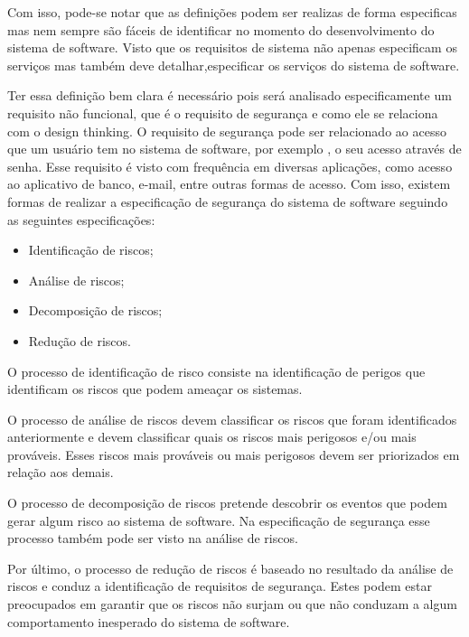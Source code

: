 \documentclass[a4paper,twoside]{article}
\begin{document}
Com isso, pode-se notar que as definições podem ser realizas de forma especificas mas nem sempre são fáceis de identificar no momento do desenvolvimento do sistema de software. Visto que os requisitos de sistema não apenas especificam os serviços mas também deve detalhar,especificar os serviços do sistema de software\cite{Sommerville_2011_texbook}.

Ter essa definição bem clara é necessário pois será analisado especificamente um requisito não funcional, que é o requisito de segurança e como ele se relaciona com o design thinking.
O requisito de segurança pode ser relacionado ao acesso que um usuário tem no sistema de software, por exemplo , o seu acesso através de senha. Esse requisito é visto com frequência em diversas aplicações, como acesso ao aplicativo de banco, e-mail, entre outras formas de acesso. Com isso, existem formas de realizar a especificação de segurança do sistema de software seguindo as seguintes especificações\cite{Sommerville_2011_texbook}:

\begin{itemize}
    \item Identificação de riscos;
    \item Análise de riscos;
    \item Decomposição de riscos;
    \item Redução de riscos.
\end{itemize}

O processo de  identificação de risco consiste na identificação de perigos que identificam os riscos que podem ameaçar os sistemas. 

O processo de análise de riscos devem classificar os riscos que foram identificados anteriormente e devem classificar quais os riscos mais perigosos e/ou mais prováveis. Esses riscos mais prováveis ou mais perigosos devem ser priorizados em relação aos demais.

O processo de decomposição de riscos pretende descobrir os eventos que podem gerar algum risco ao sistema de software. Na especificação de segurança esse processo também pode ser visto na análise de riscos.

Por último, o processo de redução de riscos é baseado no resultado da análise de riscos e conduz a identificação de requisitos de segurança. Estes podem estar preocupados em garantir que os riscos não surjam ou que não conduzam a algum comportamento inesperado do sistema de software.
\end{document}
